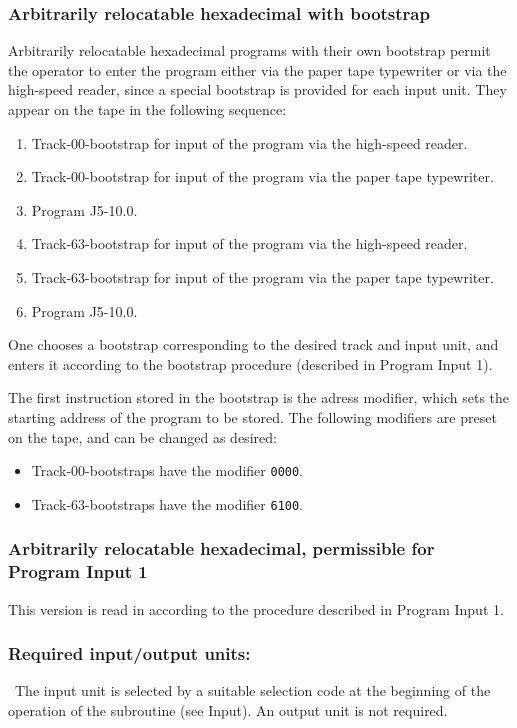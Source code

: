 \subsubsection*{Arbitrarily relocatable hexadecimal with bootstrap}
Arbitrarily relocatable hexadecimal programs with their own bootstrap permit the operator to enter the program either via the paper tape typewriter or via the high-speed reader, since a special bootstrap is provided for each input unit. They appear on the tape in the following sequence:
\begin{enumerate}
\item Track-00-bootstrap for input of the program via the high-speed reader.
\item Track-00-bootstrap for input of the program via the paper tape typewriter.
\item Program J5-10.0.
\item Track-63-bootstrap for input of the program via the high-speed reader.
\item Track-63-bootstrap for input of the program via the paper tape typewriter.
\item Program J5-10.0.
\end{enumerate}
One chooses a bootstrap corresponding to the desired track and input unit, and enters it according to the bootstrap procedure (described in Program Input 1).

The first instruction stored in the bootstrap is the adress modifier, which sets the starting address of the program to be stored. The following modifiers are preset on the tape, and can be changed as desired:
\begin{itemize}
\item Track-00-bootstraps have the modifier \texttt{0000}.
\item Track-63-bootstraps have the modifier \texttt{6100}.
\end{itemize}

\subsubsection*{Arbitrarily relocatable hexadecimal, permissible for Program Input 1}
This version is read in according to the procedure described in Program Input 1.

\subsubsection*{Required input/output units:} \
The input unit is selected by a suitable selection code at the beginning of the operation of the subroutine (see Input). An output unit is not required.


